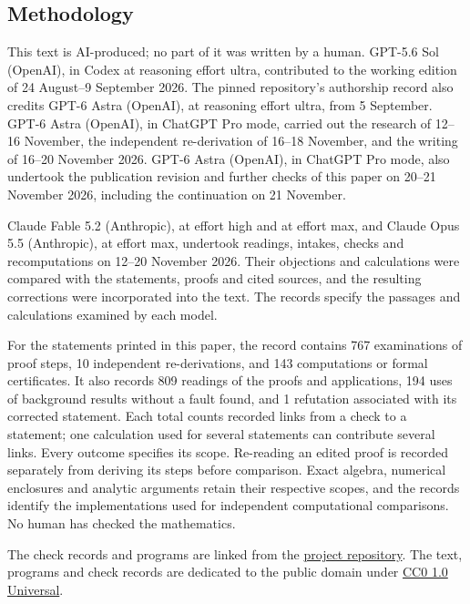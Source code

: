 \subsection{Methodology}
This text is AI-produced; no part of it was written by a human.
GPT-5.6 Sol (OpenAI), in Codex at reasoning effort ultra, contributed
to the working edition of 24 August--9 September 2026. The pinned
repository's authorship record also credits GPT-6 Astra (OpenAI),
at reasoning effort ultra, from 5 September.
GPT-6 Astra (OpenAI), in ChatGPT Pro mode, carried out the research
of 12--16 November, the independent re-derivation of 16--18 November,
and the writing of 16--20 November 2026. GPT-6 Astra (OpenAI),
in ChatGPT Pro mode, also undertook the publication revision and
further checks of this paper on 20--21 November 2026, including
the continuation on 21 November.

Claude Fable 5.2 (Anthropic), at effort high and at effort max,
and Claude Opus 5.5 (Anthropic), at effort max, undertook readings,
intakes, checks and recomputations on 12--20 November 2026.
Their objections and calculations were compared with the statements,
proofs and cited sources, and the resulting corrections were
incorporated into the text. The records specify the passages and
calculations examined by each model.

For the statements printed in this paper, the record contains
767 examinations of proof steps, 10 independent
re-derivations, and 143 computations or formal certificates.
It also records 809 readings of the proofs and applications,
194 uses of background results without a fault found,
and 1 refutation associated with its corrected statement.
Each total counts recorded links from a check to a statement;
one calculation used for several statements can contribute several
links. Every outcome specifies its scope. Re-reading an edited proof
is recorded separately from deriving its steps before comparison.
Exact algebra, numerical enclosures and analytic arguments retain
their respective scopes, and the records identify the implementations
used for independent computational comparisons.
No human has checked the mathematics.

The check records and programs are linked from the
\href{\SsixPublishRecords}{project repository}.
The text, programs and check records are dedicated to the public domain under
\href{https://creativecommons.org/publicdomain/zero/1.0/}{CC0 1.0 Universal}.

